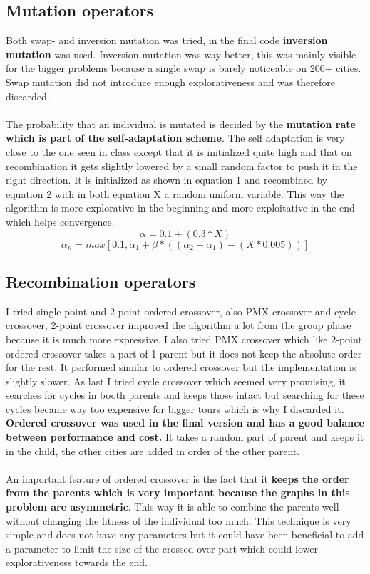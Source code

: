 \documentclass[a4paper,10pt]{article}
\begin{document}
\subsection{Mutation operators}
\label{mut}
Both swap- and inversion mutation was tried, in the final code \textbf{inversion mutation} was used. Inversion mutation was way better, this was mainly visible for the bigger problems because a single swap is barely noticeable on 200+ cities. Swap mutation did not introduce enough explorativeness and was therefore discarded. 
\\\\
The probability that an individual is mutated is decided by the \textbf{mutation rate which is part of the self-adaptation scheme}. The self adaptation is very close to the one seen in class except that it is initialized quite high and that on recombination it gets slightly lowered by a small random factor to push it in the right direction. It is initialized as shown in equation 1 and recombined by equation 2 with in both equation X a random uniform variable. This way the algorithm is more explorative in the beginning and more exploitative in the end which helps convergence.
\begin{equation}
	\alpha = 0.1 + (0.3 * X)
\end{equation}
\begin{equation}
	\alpha_n = max[0.1, \alpha_1 + \beta * ((\alpha_2 - \alpha_1) - (X*0.005))]
\end{equation}

\subsection{Recombination operators}
\label{recomb}
I tried single-point and 2-point ordered crossover, also PMX crossover and cycle crossover, 2-point crossover improved the algorithm a lot from the group phase because it is much more expressive. I also tried PMX crossover which like 2-point ordered crossover takes a part of 1 parent but it does not keep the absolute order for the rest. It performed similar to ordered crossover but the implementation is slightly slower. As last I tried cycle crossover which seemed very promising, it searches for cycles in booth parents and keeps those intact but searching for these cycles became way too expensive for bigger tours which is why I discarded it. \textbf{Ordered crossover was used in the final version and has a good balance between performance and cost.} It takes a random part of parent and keeps it in the child, the other cities are added in order of the other parent.
\\\\
An important feature of ordered crossover is the fact that it \textbf{keeps the order from the parents which is very important because the graphs in this problem are asymmetric}. This way it is able to combine the parents well without changing the fitness of the individual too much. This technique is very simple and does not have any parameters but it could have been beneficial to add a parameter to limit the size of the crossed over part which could lower explorativeness towards the end.
\end{document}
